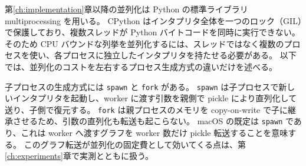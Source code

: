第\ref{ch:implementation}章以降の並列化は Python の標準ライブラリ multiprocessing を用いる。
CPython はインタプリタ全体を一つのロック（GIL）で保護しており、複数スレッドが Python バイトコードを同時に実行できない。
そのため CPU バウンドな列挙を並列化するには、スレッドではなく複数のプロセスを使い、各プロセスに独立したインタプリタを持たせる必要がある。
以下では、並列化のコストを左右するプロセス生成方式の違いだけを述べる。

子プロセスの生成方式には \texttt{spawn} と \texttt{fork} がある。
\texttt{spawn} は子プロセスで新しいインタプリタを起動し、worker に渡す引数を親側で pickle により直列化して送り、子側で復元する。
\texttt{fork} は親プロセスのメモリを copy-on-write で子に継承させるため、引数の直列化も転送も起こらない。
macOS の既定は \texttt{spawn} であり、これは worker へ渡すグラフを worker 数だけ pickle 転送することを意味する。
このグラフ転送が並列化の固定費として効いてくる点は、第\ref{ch:experiments}章で実測とともに扱う。
